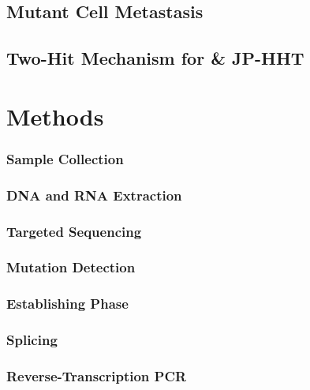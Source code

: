 \subsection{Mutant Cell Metastasis}
\subsection{Two-Hit Mechanism for  \& JP-HHT}

\section{Methods}
\subsubsection{Sample Collection}
\subsubsection{DNA and RNA Extraction}
\subsubsection{Targeted Sequencing}
\subsubsection{Mutation Detection}
\subsubsection{Establishing Phase}
\subsubsection{ Splicing}
\subsubsection{Reverse-Transcription PCR}